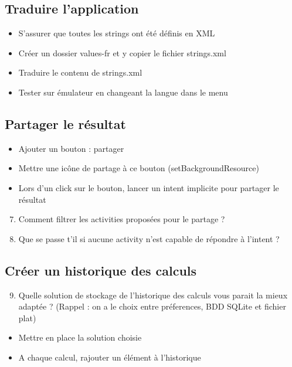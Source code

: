 \documentclass{article}
\begin{document}
\subsection{Traduire l'application}
\begin{itemize}
\item S'assurer que toutes les strings ont été définis en XML
\item Créer un dossier values-fr et y copier le fichier strings.xml
\item Traduire le contenu de strings.xml
\item Tester sur émulateur en changeant la langue dans le menu
\end{itemize}
\subsection{Partager le résultat}
\begin{itemize}
\item Ajouter un bouton : partager
\item Mettre une icône de partage à ce bouton (setBackgroundResource)
\item Lors d'un click sur le bouton, lancer un intent implicite pour partager le résultat
\end{itemize}
\begin{enumerate}
 \setcounter{enumi}{6}
\item Comment filtrer les activities proposées pour le partage ?
\item Que se passe t'il si aucune activity n'est capable de répondre à l'intent ?
\end{enumerate}
\subsection{Créer un historique des calculs}
\begin{enumerate}
 \setcounter{enumi}{8}
\item Quelle solution de stockage de l'historique des calculs vous parait la mieux adaptée ? (Rappel : on a le choix entre préferences, BDD SQLite et fichier plat) 
\end{enumerate}
\begin{itemize}
\item Mettre en place la solution choisie
\item A chaque calcul, rajouter un élément à l'historique
\end{itemize}
\end{document}
